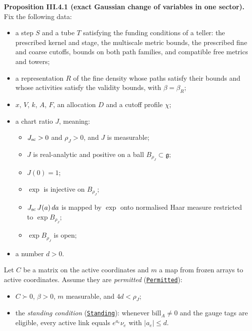 \documentclass[
  letterpaper,
  11pt]{article}
\providecommand{\tightlist}{%
  \setlength{\itemsep}{0pt}\setlength{\parskip}{0pt}}
\begin{document}
\textbf{Proposition III.4.1 (exact Gaussian change of variables in one
sector).} Fix the following data:

\begin{itemize}
\tightlist
\item
  a step \(S\) and a tube \(T\) satisfying the funding conditions of a
  teller: the prescribed kernel and stage, the multiscale metric bounds,
  the prescribed fine and coarse cutoffs, bounds on both path families,
  and compatible free metrics and towers;
\item
  a representation \(R\) of the fine density whose paths satisfy their
  bounds and whose activities satisfy the validity bounds, with
  \(\beta=\beta_R\);
\item
  \(x\), \(V\), \(k\), \(A\), \(F\), an allocation \(D\) and a cutoff
  profile \(\chi\);
\item
  a chart ratio \(J\), meaning:

  \begin{itemize}
  \tightlist
  \item
    \(J_{\rm sc}>0\) and \(\rho_J>0\), and \(J\) is measurable;
  \item
    \(J\) is real-analytic and positive on a ball
    \(B_{\rho_J}\subset\mathfrak g\);
  \item
    \(J(0)=1\);
  \item
    \(\exp\) is injective on \(B_{\rho_J}\);
  \item
    \(J_{\rm sc}\,J(a)\,da\) is mapped by \(\exp\) onto normalised Haar
    measure restricted to \(\exp B_{\rho_J}\);
  \item
    \(\exp B_{\rho_J}\) is open;
  \end{itemize}
\item
  a number \(d>0\).
\end{itemize}

Let \(C\) be a matrix on the active coordinates and \(m\) a map from
frozen arrays to active coordinates. Assume they are \emph{permitted}
(\href{https://github.com/yang-mills-group/OpenAI-YM-20261028/blob/3456e5e75cf8d4cd558955a5c7638fba2d68f464/YM/SectorNext/GAUSSIAN_SECTOR_CHANGE/Change.lean\#L95-L103}{\texttt{Permitted}}):

\begin{itemize}
\tightlist
\item
  \(C\succ0\), \(\beta>0\), \(m\) measurable, and \(4d<\rho_J\);
\item
  the \emph{standing condition}
  (\href{https://github.com/yang-mills-group/OpenAI-YM-20261028/blob/3456e5e75cf8d4cd558955a5c7638fba2d68f464/YM/SectorNext/GAUSSIAN_SECTOR_CHANGE/Shell.lean\#L51-L55}{\texttt{Standing}}):
  whenever \(\mathrm{bill}_A\ne0\) and the gauge tags are eligible,
  every active link equals \(e^{a_e}\nu_e\) with
  \(\lvert a_e\rvert\le d\).
\end{itemize}
\end{document}
